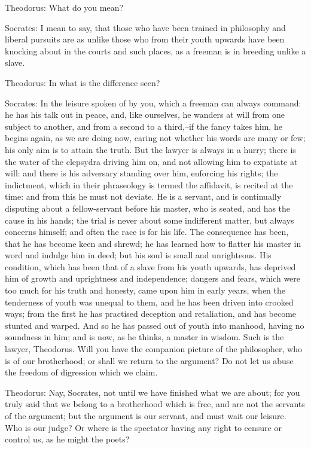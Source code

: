 Theodorus: What do you mean?

Socrates: I mean to say, that those who have been trained in philosophy
and liberal pursuits are as unlike those who from their youth upwards
have been knocking about in the courts and such places, as a freeman is
in breeding unlike a slave.

Theodorus: In what is the difference seen?

Socrates: In the leisure spoken of by you, which a freeman can always
command: he has his talk out in peace, and, like ourselves, he wanders
at will from one subject to another, and from a second to a third,--if
the fancy takes him, he begins again, as we are doing now, caring not
whether his words are many or few; his only aim is to attain the truth.
But the lawyer is always in a hurry; there is the water of the clepsydra
driving him on, and not allowing him to expatiate at will: and there is
his adversary standing over him, enforcing his rights; the indictment,
which in their phraseology is termed the affidavit, is recited at
the time: and from this he must not deviate. He is a servant, and is
continually disputing about a fellow-servant before his master, who is
seated, and has the cause in his hands; the trial is never about some
indifferent matter, but always concerns himself; and often the race
is for his life. The consequence has been, that he has become keen and
shrewd; he has learned how to flatter his master in word and indulge him
in deed; but his soul is small and unrighteous. His condition, which has
been that of a slave from his youth upwards, has deprived him of growth
and uprightness and independence; dangers and fears, which were too
much for his truth and honesty, came upon him in early years, when the
tenderness of youth was unequal to them, and he has been driven into
crooked ways; from the first he has practised deception and retaliation,
and has become stunted and warped. And so he has passed out of youth
into manhood, having no soundness in him; and is now, as he thinks,
a master in wisdom. Such is the lawyer, Theodorus. Will you have the
companion picture of the philosopher, who is of our brotherhood; or
shall we return to the argument? Do not let us abuse the freedom of
digression which we claim.

Theodorus: Nay, Socrates, not until we have finished what we are about;
for you truly said that we belong to a brotherhood which is free, and
are not the servants of the argument; but the argument is our servant,
and must wait our leisure. Who is our judge? Or where is the spectator
having any right to censure or control us, as he might the poets?

